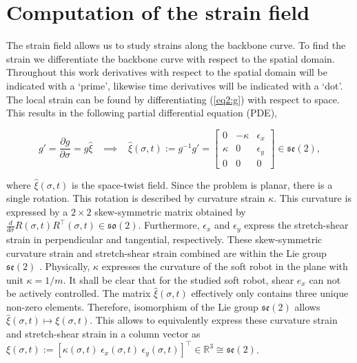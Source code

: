 \section{Computation of the strain field}

The strain field allows us to study strains along the backbone curve. To find the strain we differentiate the backbone curve with respect to the spatial domain. Throughout this work derivatives with respect to the spatial domain will be indicated with a `prime', likewise time derivatives will be indicated with a `dot'. The local strain can be found by differentiating (\ref{eq2:g}) with respect to space. This results in the following partial differential equation (PDE), 

\begin{equation}
   g' = \frac{\partial g}{\partial \sigma} = g \hat{\xi} \hspace{10pt} \implies \hspace{10pt}  \hat{\xi}(\sigma,t) := g^{-1}g' = \begin{bmatrix} 0 & -\kappa & \epsilon_x  \\ \kappa & 0 & \epsilon_y \\ 0 & 0 & 0 \end{bmatrix} \in  \mathfrak{se}(2),
    \label{eq2:dgdsigma}
\end{equation}

where $\hat{\xi}(\sigma,t)$ is the space-twist field. Since the problem is planar, there is a single rotation. This rotation is described by curvature strain $\kappa$. This curvature is expressed by a $2 \times 2$ skew-symmetric matrix obtained by $\frac{d}{d\sigma}R(\sigma,t)R^\top(\sigma,t) \in \mathfrak{so}(2)$. Furthermore, $\epsilon_x$ and $\epsilon_y$ express the stretch-shear strain in perpendicular and tangential, respectively. These skew-symmetric curvature strain and stretch-shear strain combined are within the Lie group $\mathfrak{se}(2)$ \cite{Sola2018}. Physically, $\kappa$ expresses the curvature of the soft robot in the plane with unit $\kappa = 1/m$. It shall be clear that for the studied soft robot, shear $e_x$ can not be actively controlled. The matrix $\hat{\xi}(\sigma,t)$ effectively only contains three unique non-zero elements. Therefore, isomorphism of the Lie group $\mathfrak{se}(2)$ allows $\hat{\xi}(\sigma,t) \longmapsto \xi(\sigma,t)$. This allows to equivalently express these curvature strain and stretch-shear strain in a column vector as $\xi(\sigma,t):= [\kappa(\sigma,t) \hspace{3pt} \epsilon_x(\sigma,t) \hspace{3pt} \epsilon_y(\sigma,t) ]^\top \in \mathbb{R}^3 \cong \mathfrak{se}(2)$.

